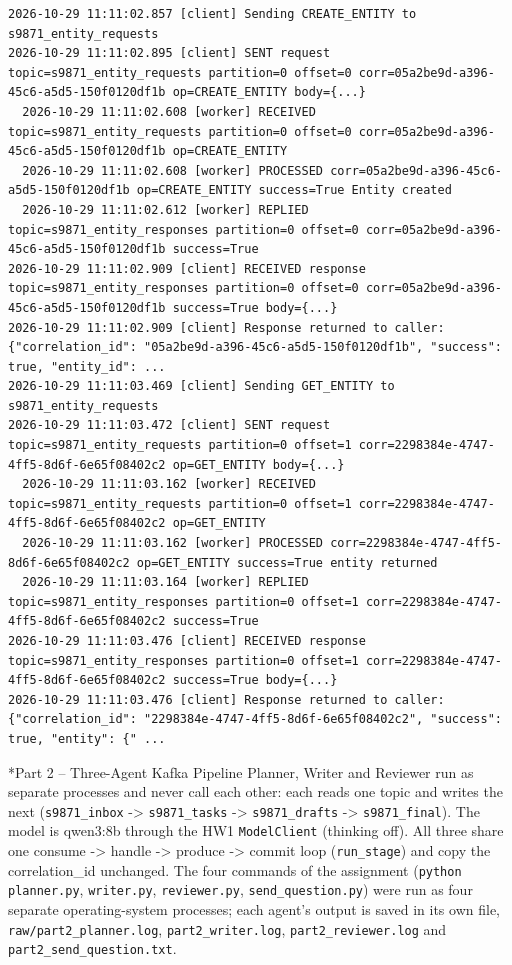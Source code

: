 \documentclass[11pt]{article}
\makeatletter
\renewcommand\section{\@startsection{section}{1}{\z@}{-3.0ex \@plus -1ex \@minus -.2ex}{1.2ex \@plus.2ex}{\normalfont\fontsize{14}{17}\selectfont\bfseries}}
\makeatother
\begin{document}
\begingroup\lstset{basicstyle=\ttfamily\tiny}
\begin{lstlisting}
2026-10-29 11:11:02.857 [client] Sending CREATE_ENTITY to s9871_entity_requests
2026-10-29 11:11:02.895 [client] SENT request topic=s9871_entity_requests partition=0 offset=0 corr=05a2be9d-a396-45c6-a5d5-150f0120df1b op=CREATE_ENTITY body={...}
  2026-10-29 11:11:02.608 [worker] RECEIVED topic=s9871_entity_requests partition=0 offset=0 corr=05a2be9d-a396-45c6-a5d5-150f0120df1b op=CREATE_ENTITY
  2026-10-29 11:11:02.608 [worker] PROCESSED corr=05a2be9d-a396-45c6-a5d5-150f0120df1b op=CREATE_ENTITY success=True Entity created
  2026-10-29 11:11:02.612 [worker] REPLIED topic=s9871_entity_responses partition=0 offset=0 corr=05a2be9d-a396-45c6-a5d5-150f0120df1b success=True
2026-10-29 11:11:02.909 [client] RECEIVED response topic=s9871_entity_responses partition=0 offset=0 corr=05a2be9d-a396-45c6-a5d5-150f0120df1b success=True body={...}
2026-10-29 11:11:02.909 [client] Response returned to caller: {"correlation_id": "05a2be9d-a396-45c6-a5d5-150f0120df1b", "success": true, "entity_id": ...
2026-10-29 11:11:03.469 [client] Sending GET_ENTITY to s9871_entity_requests
2026-10-29 11:11:03.472 [client] SENT request topic=s9871_entity_requests partition=0 offset=1 corr=2298384e-4747-4ff5-8d6f-6e65f08402c2 op=GET_ENTITY body={...}
  2026-10-29 11:11:03.162 [worker] RECEIVED topic=s9871_entity_requests partition=0 offset=1 corr=2298384e-4747-4ff5-8d6f-6e65f08402c2 op=GET_ENTITY
  2026-10-29 11:11:03.162 [worker] PROCESSED corr=2298384e-4747-4ff5-8d6f-6e65f08402c2 op=GET_ENTITY success=True entity returned
  2026-10-29 11:11:03.164 [worker] REPLIED topic=s9871_entity_responses partition=0 offset=1 corr=2298384e-4747-4ff5-8d6f-6e65f08402c2 success=True
2026-10-29 11:11:03.476 [client] RECEIVED response topic=s9871_entity_responses partition=0 offset=1 corr=2298384e-4747-4ff5-8d6f-6e65f08402c2 success=True body={...}
2026-10-29 11:11:03.476 [client] Response returned to caller: {"correlation_id": "2298384e-4747-4ff5-8d6f-6e65f08402c2", "success": true, "entity": {" ...
\end{lstlisting}
\endgroup
\section*{Part 2 -- Three-Agent Kafka Pipeline}
Planner, Writer and Reviewer run as separate processes and never call each other: each reads one topic and writes the next (\texttt{s9871\_\allowbreak{}inbox} -> \texttt{s9871\_\allowbreak{}tasks} -> \texttt{s9871\_\allowbreak{}drafts} -> \texttt{s9871\_\allowbreak{}final}). The model is qwen3:8b through the HW1 \texttt{ModelClient} (thinking off). All three share one consume -> handle -> produce -> commit loop (\texttt{run\_\allowbreak{}stage}) and copy the correlation\_id unchanged. The four commands of the assignment (\texttt{python planner.py}, \texttt{writer.py}, \texttt{reviewer.py}, \texttt{send\_\allowbreak{}question.py}) were run as four separate operating-system processes; each agent's output is saved in its own file, \texttt{raw/\allowbreak{}part2\_\allowbreak{}planner.log}, \texttt{part2\_\allowbreak{}writer.log}, \texttt{part2\_\allowbreak{}reviewer.log} and \texttt{part2\_\allowbreak{}send\_\allowbreak{}question.txt}.
\end{document}
